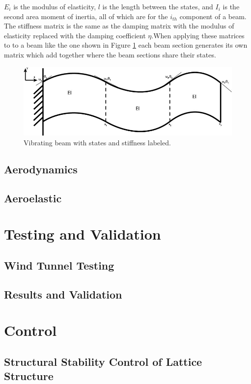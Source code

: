 \documentclass[11pt]{ucthesis}
\begin{document}
$E_i$ is the modulus of elasticity, $l$ is the length between the states, and $I_i$ is the second area moment of inertia, all of which are for the $i_{th}$ component of a beam. The stiffness matrix is the same as the damping matrix with the modulus of elasticity replaced with the damping coefficient $\eta$.When applying these matrices to to a beam like the one shown in Figure \ref{fig:Beam} each beam section generates its own matrix which add together where the beam sections share their states.
\begin{figure}[h]
\centering
\includegraphics[width=.6\linewidth]{Figures/Beam.jpg}
\caption{Vibrating beam with states and stiffness labeled.}
\label{fig:Beam} 
\end{figure}

\section{Aerodynamics}

\section{Aeroelastic}

\chapter{Testing and Validation}
\section{Wind Tunnel Testing}
\section{Results and Validation}

\chapter{Control}
\section{Structural Stability Control of Lattice Structure}
\end{document}
